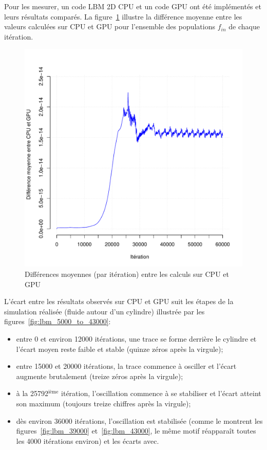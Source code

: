 Pour les mesurer, un code \ac{LBM} 2D \acs{CPU} et un code \acs{GPU} ont été implémentés et leurs résultats comparés. La figure~\ref{fig:lbm_float_deltas} illustre la différence moyenne entre les valeurs calculées sur \acs{CPU} et \acs{GPU} pour l'ensemble des populations $f_{in}$ de chaque itération.

\begin{figure}[H]
	\centering
	\includegraphics[scale=0.685, fbox]{../data/lbm_cpu_vs_gpu/deltas/Rplots.pdf}
	\caption{Différences moyennes (par itération) entre les calculs sur \acs{CPU} et \acs{GPU}}
	\label{fig:lbm_float_deltas}
\end{figure}

L'écart entre les résultats observés sur \acs{CPU} et \acs{GPU} suit les étapes de la simulation réalisée (fluide autour d'un cylindre) illustrée par les figures~\ref{fig:lbm_5000_to_43000}:
\begin{itemize}
	\item entre 0 et environ 12000 itérations, une trace se forme derrière le cylindre et l'écart moyen reste faible et stable (quinze zéros après la virgule);
	\item entre 15000 et 20000 itérations, la trace commence à osciller et l'écart augmente brutalement (treize zéros après la virgule);
	\item à la 25792$^{\textrm{ième}}$ itération, l'oscillation commence à se stabiliser et l'écart atteint son maximum (toujours treize chiffres après la virgule);
	\item dès environ 36000 itérations, l'oscillation est stabilisée (comme le montrent les figures~\ref{fig:lbm_39000} et~\ref{fig:lbm_43000}, le même motif réapparaît toutes les 4000 itérations environ) et les écarts avec.
\end{itemize}

